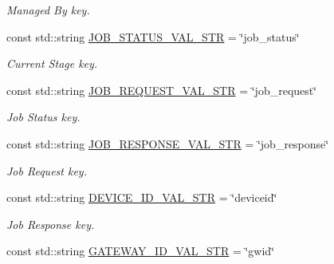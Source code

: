 \begin{DoxyCompactItemize}
\begin{DoxyCompactList}\small\item\em Managed By key. \end{DoxyCompactList}\item 
const std\+::string \hyperlink{namespacevalStrings_a165a6a968c19e68a4ce7f895943f10cc}{J\+O\+B\+\_\+\+S\+T\+A\+T\+U\+S\+\_\+\+V\+A\+L\+\_\+\+S\+TR} = \char`\"{}job\+\_\+status\char`\"{}\hypertarget{namespacevalStrings_a165a6a968c19e68a4ce7f895943f10cc}{}\label{namespacevalStrings_a165a6a968c19e68a4ce7f895943f10cc}

\begin{DoxyCompactList}\small\item\em Current Stage key. \end{DoxyCompactList}\item 
const std\+::string \hyperlink{namespacevalStrings_a001a5b1fe13c15fca5c34ace4a13d74d}{J\+O\+B\+\_\+\+R\+E\+Q\+U\+E\+S\+T\+\_\+\+V\+A\+L\+\_\+\+S\+TR} = \char`\"{}job\+\_\+request\char`\"{}\hypertarget{namespacevalStrings_a001a5b1fe13c15fca5c34ace4a13d74d}{}\label{namespacevalStrings_a001a5b1fe13c15fca5c34ace4a13d74d}

\begin{DoxyCompactList}\small\item\em Job Status key. \end{DoxyCompactList}\item 
const std\+::string \hyperlink{namespacevalStrings_aebcb1b337b4229bf2b7a34e2552fa3a0}{J\+O\+B\+\_\+\+R\+E\+S\+P\+O\+N\+S\+E\+\_\+\+V\+A\+L\+\_\+\+S\+TR} = \char`\"{}job\+\_\+response\char`\"{}\hypertarget{namespacevalStrings_aebcb1b337b4229bf2b7a34e2552fa3a0}{}\label{namespacevalStrings_aebcb1b337b4229bf2b7a34e2552fa3a0}

\begin{DoxyCompactList}\small\item\em Job Request key. \end{DoxyCompactList}\item 
const std\+::string \hyperlink{namespacevalStrings_a27f397fcac2beb20ee84786470576eec}{D\+E\+V\+I\+C\+E\+\_\+\+I\+D\+\_\+\+V\+A\+L\+\_\+\+S\+TR} = \char`\"{}deviceid\char`\"{}\hypertarget{namespacevalStrings_a27f397fcac2beb20ee84786470576eec}{}\label{namespacevalStrings_a27f397fcac2beb20ee84786470576eec}

\begin{DoxyCompactList}\small\item\em Job Response key. \end{DoxyCompactList}\item 
const std\+::string \hyperlink{namespacevalStrings_a1e8e823898fbc4be292941e6fb98ac71}{G\+A\+T\+E\+W\+A\+Y\+\_\+\+I\+D\+\_\+\+V\+A\+L\+\_\+\+S\+TR} = \char`\"{}gwid\char`\"{}\hypertarget{namespacevalStrings_a1e8e823898fbc4be292941e6fb98ac71}{}\label{namespacevalStrings_a1e8e823898fbc4be292941e6fb98ac71}


\end{DoxyCompactItemize}
